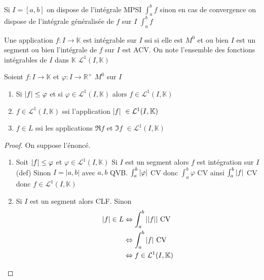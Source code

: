 \documentclass[11pt,hidelinks]{book}
\theoremstyle{mytheoremstyle}
\theoremstyle{mytheoremstyle}
\theoremstyle{mytheoremstyle}
\theoremstyle{mytheoremstyle}
\theoremstyle{mytheoremstyle}
\theoremstyle{mytheoremstyle}
\theoremstyle{mytheoremstyle}
\theoremstyle{mytheoremstyle}
\theoremstyle{myproblemstyle}
\def\mbb#1{\mathbb{#1}}
\def\mfc#1{\mathcal{#1}}
\def\bR{\mbb{R}}
\def\L{\mfc{L}^1(I,\bK)}
\def\bK{\mbb{K}}
\newcommand{\func}[3]{#1\colon#2\to#3}
\begin{document}
    Si $I = [a,b]$ on dispose de l'intégrale MPSI $\int_{a}^{b} f$ sinon en cas de convergence on 
    dispose de l'intégrale généralisée de $f$ sur $I$ $\int_{a}^{b} f$
    \begin{definition}
        Une application $\func{f}{I}{\bK}$ est intégrable sur $I$
        ssi si elle est $M^0$ et ou bien $I$ est un segment ou bien l'intégrale de $f$
        sur $I$ est ACV. On note l'ensemble des fonctions intégrables de $I$ dans $\bK$ 
        $\L$ 
    \end{definition}
    \begin{adjustwidth}{-2em}{-1em}
        \begin{prop}
        Soient $\func{f}{I}{\bK}$ et $\func{\varphi}{I}{\bR^+}$ $M^0$ sur $I$
        \begin{enumerate}
        \item Si $\abs{f} \leq \varphi$ et si $\varphi \in \L$ alors $f \in \L$ 
        \item $f \in \L$ ssi l'application $\abs{f} \in \L$ 
        \item $f \in L$ ssi les applications $\Re f$ et $\Im f$ $\in \L$
        \end{enumerate}
        \begin{proof}
            On suppose l'énoncé.
            \begin{enumerate}
            \item Soit $\abs{f} \leq \varphi$ et $\varphi \in \L$ \newline 
            Si $I$ est un segment alors $f$ est intégration sur $I$ (def)
            Sinon $I = |a,b|$ avec $a,b$ QVB. $\int_{a}^{b} \abs{\varphi}$ CV donc $\int_{a}^{b} \varphi$ CV
            ainsi $\int_{a}^{b} \abs{f}$ CV donc $f \in \L$ \newline 

            \item Si $I$ est un segment alors CLF.
            Sinon 
            \begin{align*}
                \abs{f} \in L &\Leftrightarrow \int_{a}^{b} \abs{\abs{f}} \text{ CV} \\ 
                                &\Leftrightarrow \int_{a}^{b} \abs{f} \text{ CV} \\ 
                                &\Leftrightarrow f \in \L \\ 
            \end{align*}


\end{enumerate}
\end{proof}
\end{prop}
\end{adjustwidth}
\end{document}
